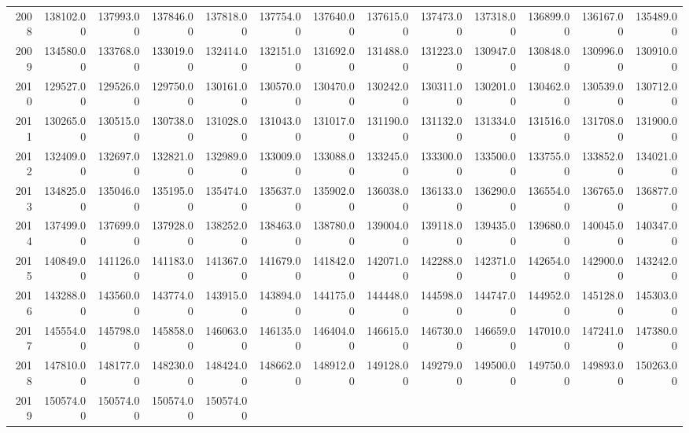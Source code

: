 \begin{longtable}{rrrrrrrrrrrrr}
  2008 & 138102.00 & 137993.00 & 137846.00 & 137818.00 & 137754.00 & 137640.00 & 137615.00 & 137473.00 & 137318.00 & 136899.00 & 136167.00 & 135489.00 \\ 
  2009 & 134580.00 & 133768.00 & 133019.00 & 132414.00 & 132151.00 & 131692.00 & 131488.00 & 131223.00 & 130947.00 & 130848.00 & 130996.00 & 130910.00 \\ 
  2010 & 129527.00 & 129526.00 & 129750.00 & 130161.00 & 130570.00 & 130470.00 & 130242.00 & 130311.00 & 130201.00 & 130462.00 & 130539.00 & 130712.00 \\ 
  2011 & 130265.00 & 130515.00 & 130738.00 & 131028.00 & 131043.00 & 131017.00 & 131190.00 & 131132.00 & 131334.00 & 131516.00 & 131708.00 & 131900.00 \\ 
  2012 & 132409.00 & 132697.00 & 132821.00 & 132989.00 & 133009.00 & 133088.00 & 133245.00 & 133300.00 & 133500.00 & 133755.00 & 133852.00 & 134021.00 \\ 
  2013 & 134825.00 & 135046.00 & 135195.00 & 135474.00 & 135637.00 & 135902.00 & 136038.00 & 136133.00 & 136290.00 & 136554.00 & 136765.00 & 136877.00 \\ 
  2014 & 137499.00 & 137699.00 & 137928.00 & 138252.00 & 138463.00 & 138780.00 & 139004.00 & 139118.00 & 139435.00 & 139680.00 & 140045.00 & 140347.00 \\ 
  2015 & 140849.00 & 141126.00 & 141183.00 & 141367.00 & 141679.00 & 141842.00 & 142071.00 & 142288.00 & 142371.00 & 142654.00 & 142900.00 & 143242.00 \\ 
  2016 & 143288.00 & 143560.00 & 143774.00 & 143915.00 & 143894.00 & 144175.00 & 144448.00 & 144598.00 & 144747.00 & 144952.00 & 145128.00 & 145303.00 \\ 
  2017 & 145554.00 & 145798.00 & 145858.00 & 146063.00 & 146135.00 & 146404.00 & 146615.00 & 146730.00 & 146659.00 & 147010.00 & 147241.00 & 147380.00 \\ 
  2018 & 147810.00 & 148177.00 & 148230.00 & 148424.00 & 148662.00 & 148912.00 & 149128.00 & 149279.00 & 149500.00 & 149750.00 & 149893.00 & 150263.00 \\ 
  2019 & 150574.00 & 150574.00 & 150574.00 & 150574.00 &  &  &  &  &  &  &  &  \\ 
   \hline
\hline
\end{longtable}

